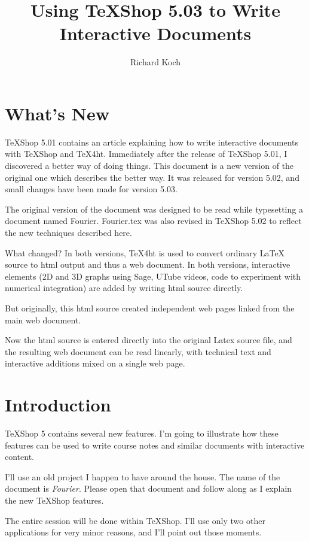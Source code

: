 \documentclass[11pt, oneside]{article}   	%
\title{Using TeXShop 5.03 to Write Interactive Documents}
\author{Richard Koch}
\begin{document}
\maketitle

\section{What's New}

TeXShop 5.01 contains an article explaining how to write interactive documents with TeXShop and TeX4ht.  Immediately after the release of TeXShop 5.01, I discovered a better way of doing things. This document is a new version of the original one which describes the better way. It was released for version 5.02, and small changes have been made for version 5.03. 

The original version of the document was designed to be read while typesetting a document named Fourier. Fourier.tex was also revised in TeXShop 5.02 to reflect the new techniques described here. 

What changed? In both versions, TeX4ht is used to convert  ordinary LaTeX source to html output and thus a web document. In both versions, interactive elements (2D and 3D graphs using Sage, UTube videos,  code to experiment with numerical integration) are added by writing html source directly.

But originally, this html source created independent web pages linked from the main web document.

Now the html source is entered directly into the original Latex source file, and the resulting web document can be read linearly, with technical text and interactive additions mixed on a single web page.


\newpage
\section{Introduction}

TeXShop 5 contains several new features. I'm going to illustrate how these features can be used to write course notes and similar documents with interactive content. 

I'll use an old project I happen to have around the house. The name of the document is {\em Fourier}.  Please open that document and follow along as I explain the new TeXShop features.

The entire session will be done within TeXShop. I'll use only two other applications for very minor reasons, and I'll point out those moments.
\end{document}
